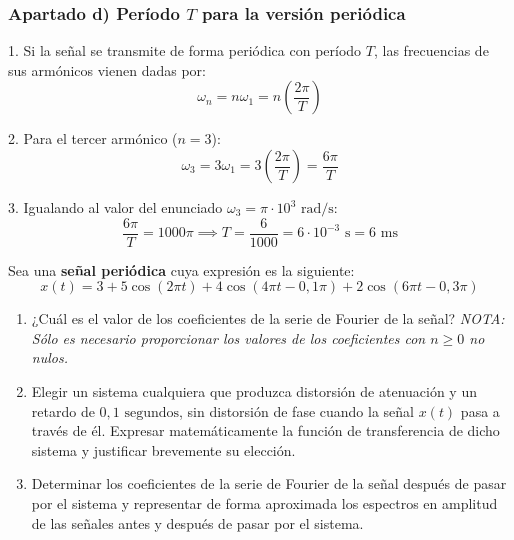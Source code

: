 \begin{resolucion}
\subsubsection*{Apartado d) Período $T$ para la versión periódica}

1. Si la señal se transmite de forma periódica con período $T$, las frecuencias de sus armónicos vienen dadas por:
   \[
   \omega_n = n \omega_1 = n \left(\frac{2\pi}{T}\right)
   \]

2. Para el tercer armónico ($n = 3$):
   \[
   \omega_3 = 3 \omega_1 = 3 \left(\frac{2\pi}{T}\right) = \frac{6\pi}{T}
   \]

3. Igualando al valor del enunciado $\omega_3 = \pi \cdot 10^3 \text{ rad/s}$:
   \[
   \frac{6\pi}{T} = 1000\pi \implies T = \frac{6}{1000} = 6 \cdot 10^{-3} \text{ s} = 6 \text{ ms}
   \]
\end{resolucion}

\newpage

\begin{problema}
Sea una \textbf{señal periódica} cuya expresión es la siguiente:
\[
x(t) = 3 + 5\cos(2\pi t) + 4\cos(4\pi t - 0{,}1\pi) + 2\cos(6\pi t - 0{,}3\pi)
\]

\begin{enumerate}[label=\alph*)]
    \item ¿Cuál es el valor de los coeficientes de la serie de Fourier de la señal? \textit{NOTA: Sólo es necesario proporcionar los valores de los coeficientes con $n \ge 0$ no nulos.}
    \item Elegir un sistema cualquiera que produzca distorsión de atenuación y un retardo de $0{,}1\text{ segundos}$, sin distorsión de fase cuando la señal $x(t)$ pasa a través de él. Expresar matemáticamente la función de transferencia de dicho sistema y justificar brevemente su elección.
    \item Determinar los coeficientes de la serie de Fourier de la señal después de pasar por el sistema y representar de forma aproximada los espectros en amplitud de las señales antes y después de pasar por el sistema.
\end{enumerate}
\end{problema}

